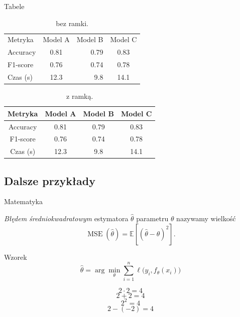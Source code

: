 \documentclass[polish]{beamer}
\begin{document}
\begin{frame}{Tabele}
  \begin{table}
    \centering
    \small
    \begin{tabular}{lcrc} %
      Metryka & Model A & Model B & Model C \\
      Accuracy & 0.81 & 0.79 & 0.83 \\
      F1-score & 0.76 & 0.74 & 0.78 \\
      Czas (s) & 12.3 & 9.8 & 14.1 \\
    \end{tabular}
    \caption{\small bez ramki.}
  \end{table}

    \begin{table}
    \centering
    \small
    \begin{tabular}{|c||c|c|c|}
      \hline
      Metryka & Model A & Model B & Model C \\
      \hline
      Accuracy & 0.81 & 0.79 & 0.83 \\
      F1-score & 0.76 & 0.74 & 0.78 \\
      Czas (s) & 12.3 & 9.8 & 14.1 \\
      \hline
    \end{tabular}
    \caption{\small z ramką.}
  \end{table}
\end{frame}

\subsection{Dalsze przykłady}
\begin{frame}{Matematyka}
  \begin{definition}
  \textit{Błędem średniokwadratowym} estymatora $\hat{\theta}$ parametru $\theta$ nazywamy wielkość
  $$\operatorname{MSE} ({\hat {\theta }})= \mathbb{E} [({\hat {\theta }}-\theta )^{2}].$$
  \end{definition}
  
  \begin{block}{Wzorek}
    \[
      \hat{\theta} = \arg\min_{\theta} \sum_{i=1}^{n} \ell\big(y_i, f_{\theta}(x_i)\big)
    \]
  \end{block}
  
  $$ 2 \cdot 2 = 4 $$
  \[ 2 + 2 = 4 \]
 \begin{equation}
     2^2 = 4
 \end{equation}
  \begin{equation*}
     2 - (-2) = 4
 \end{equation*}
\end{frame}
\end{document}
